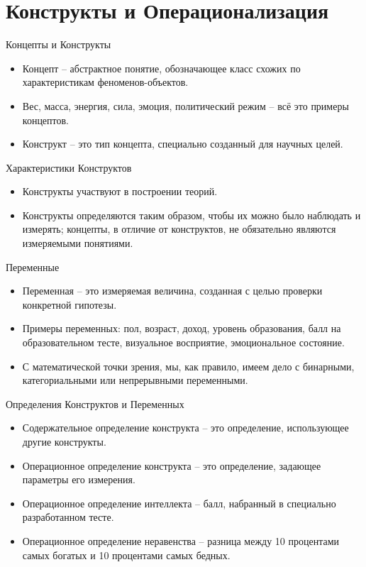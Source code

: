 \documentclass{beamer}
\begin{document}
\section{Конструкты и Операционализация}
\begin{frame}{Концепты и Конструкты}
\begin{itemize}
	\setlength\itemsep{1em}
	\item Концепт -- абстрактное понятие,  обозначающее класс схожих по характеристикам феноменов-объектов.
	\item Вес,  масса,  энергия,  сила,  эмоция,  политический режим -- всё это примеры концептов. 
	 \item Конструкт -- это тип концепта,  специально созданный для научных целей.
\end{itemize}
\end{frame}
\begin{frame}{Характеристики Конструктов}
\begin{itemize}
	\setlength\itemsep{1em}
	\item Конструкты участвуют в построении теорий.
	\item Конструкты определяются таким образом,  чтобы их можно было наблюдать и измерять; концепты, в отличие от конструктов,  не обязательно являются измеряемыми понятиями. 
\end{itemize}
\end{frame}
\begin{frame}{Переменные}
\begin{itemize}
	\setlength\itemsep{1em}
	\item Переменная -- это измеряемая величина,  созданная с целью проверки конкретной гипотезы. 
	\item Примеры переменных: пол,  возраст,  доход,  уровень образования,  балл на образовательном тесте,  визуальное восприятие, эмоциональное состояние. 
	\item С математической точки зрения, мы, как правило, имеем дело с бинарными,  категориальными или непрерывными переменными. 
\end{itemize}
\end{frame}
\begin{frame}{Определения Конструктов и Переменных}
\begin{itemize}
	\setlength\itemsep{2em}
	\item Содержательное определение конструкта -- это определение,  использующее другие конструкты. 
	\item Операционное определение конструкта -- это определение,  задающее параметры его измерения. 
	\item Операционное определение интеллекта -- балл, набранный в специально разработанном тесте.
	\item Операционное определение неравенства -- разница между 10 процентами самых богатых и 10 процентами самых бедных.
\end{itemize}
\end{frame}
\end{document}
